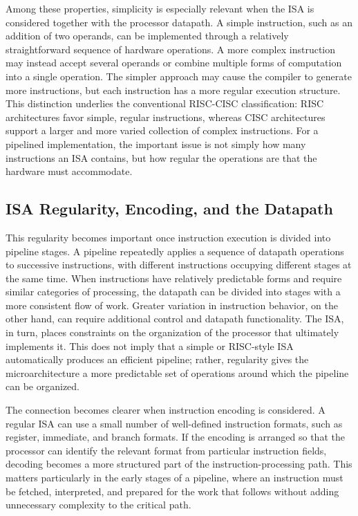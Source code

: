 \documentclass[12pt,a4paper]{report}
\begin{document}
Among these properties, simplicity is especially relevant when the ISA is considered together with the processor datapath. A simple instruction, such as an addition of two operands, can be implemented through a relatively straightforward sequence of hardware operations. A more complex instruction may instead accept several operands or combine multiple forms of computation into a single operation. The simpler approach may cause the compiler to generate more instructions, but each instruction has a more regular execution structure. This distinction underlies the conventional RISC-CISC classification: RISC architectures favor simple, regular instructions, whereas CISC architectures support a larger and more varied collection of complex instructions. For a pipelined implementation, the important issue is not simply how many instructions an ISA contains, but how regular the operations are that the hardware must accommodate.~\cite{sarangi}

\subsection{ISA Regularity, Encoding, and the Datapath}

This regularity becomes important once instruction execution is divided into pipeline stages. A pipeline repeatedly applies a sequence of datapath operations to successive instructions, with different instructions occupying different stages at the same time. When instructions have relatively predictable forms and require similar categories of processing, the datapath can be divided into stages with a more consistent flow of work. Greater variation in instruction behavior, on the other hand, can require additional control and datapath functionality. The ISA, in turn, places constraints on the organization of the processor that ultimately implements it. This does not imply that a simple or RISC-style ISA automatically produces an efficient pipeline; rather, regularity gives the microarchitecture a more predictable set of operations around which the pipeline can be organized.

The connection becomes clearer when instruction encoding is considered. A regular ISA can use a small number of well-defined instruction formats, such as register, immediate, and branch formats. If the encoding is arranged so that the processor can identify the relevant format from particular instruction fields, decoding becomes a more structured part of the instruction-processing path. This matters particularly in the early stages of a pipeline, where an instruction must be fetched, interpreted, and prepared for the work that follows without adding unnecessary complexity to the critical path.
\end{document}
